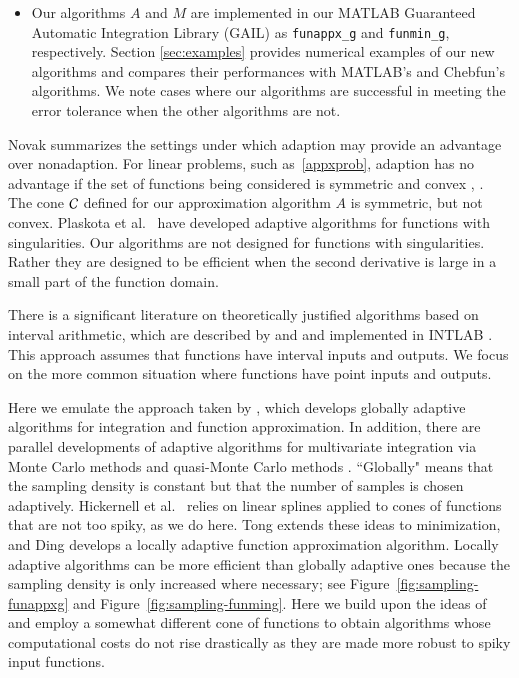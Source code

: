 \documentclass[review]{elsarticle}
\theoremstyle{definition}
\newcommand{\funappxg}{\texttt{funappx\_g}\xspace}
\newcommand{\funming}{\texttt{funmin\_g\xspace}}
\begin{document}
\begin{itemize}
\item Our algorithms $A$ and $M$ are implemented in our MATLAB Guaranteed Automatic Integration Library (GAIL) \cite{ChoEtal15a}  as \funappxg and \funming, respectively.   Section \ref{sec:examples} provides numerical examples of our new algorithms and compares their performances with MATLAB's  and Chebfun's algorithms.  We note cases where our algorithms are successful in meeting the error tolerance when the other algorithms are not.

\end{itemize}

Novak \cite{Nov96a} summarizes the settings under which adaption may provide an advantage over nonadaption.  For linear problems, such as~\eqref{appxprob}, adaption has no advantage if the set of functions being considered is symmetric and convex  \cite[Theorem 1]{Nov96a}, \cite[Chapter 4, Theorem 5.2.1]{TraWasWoz88}.  The cone $\mathcal{C}$ defined for our approximation algorithm $A$ is symmetric, but not convex.  Plaskota et al.~\cite{PlaEtal08a} have developed adaptive algorithms for functions with singularities.  Our algorithms are not designed for functions with singularities. Rather they are designed to be efficient when the second derivative is large in a small part of the function domain.

There is a significant literature on theoretically justified algorithms based on interval arithmetic, which are described by \cite{MoKeCl09} and \cite{Rum10a} and implemented in INTLAB \cite{Rum99a}.  This approach assumes that functions have interval inputs and outputs.  We focus on the more common situation where functions have point inputs and outputs.

Here we emulate the approach taken by \cite{HicEtal14b}, which develops globally adaptive algorithms for integration and function approximation.  In addition, there are parallel developments of adaptive algorithms for multivariate integration via Monte Carlo methods \citep{HicEtal14a, Jia16a} and quasi-Monte Carlo methods \citep{HicJim16a,JimHic16a}.  ``Globally" means that the sampling density is constant but that the number of samples is chosen adaptively.  Hickernell et al.~\cite{HicEtal14b} relies on linear splines applied to cones of functions that are not too spiky, as we do here.  Tong \cite{Ton14a} extends these ideas to minimization, and Ding \cite{Din15a} develops a locally adaptive function approximation algorithm.  Locally adaptive algorithms can be more efficient than globally adaptive ones because the sampling density is only increased where necessary; see Figure~\ref{fig:sampling-funappxg} and Figure~\ref{fig:sampling-funming}. Here we build upon the ideas of \cite{Din15a} and employ a somewhat different cone of functions to obtain algorithms whose computational costs do not rise drastically as they are made more robust to spiky input functions.
\end{document}
